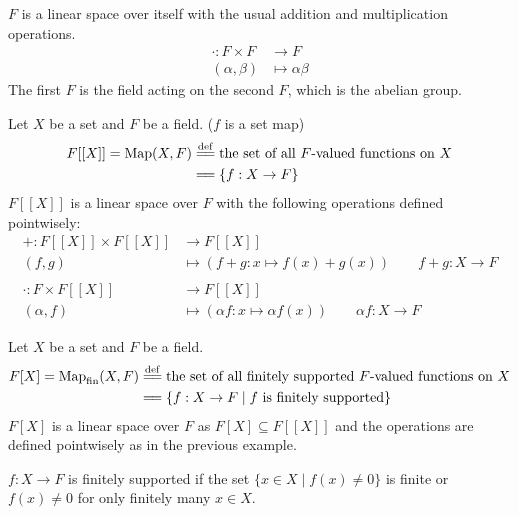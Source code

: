 \documentclass[
	11pt, %
	fleqn, %
	a4paper, %
]{LegrandOrangeBook}
\begin{document}
\begin{example}
    $F$ is a linear space over itself with the usual addition and multiplication operations.
    \[
        \begin{split}
            \cdot : F \times F &\to F \\
            (\alpha,\beta) &\mapsto \alpha \beta
        \end{split}
    \]
    The first $F$ is the field acting on the second $F$, which is the abelian group.
\end{example}

\begin{example}
    Let $X$ be a set and $F$ be a field. ($f$ is a set map)
    \[
    \begin{split}
        F[[X]] = \text{Map}(X, F) &\overset{\mathrm{def}}{=\joinrel=} \text{the set of all $F$-valued functions on } X \\
        &=\joinrel= \left\{ f : X \to F \right\}
    \end{split}
    \]
    $F[[X]]$ is a linear space over $F$ with the following operations defined pointwisely:
    \[
        \begin{split}
            + : F[[X]] \times F[[X]] &\to F[[X]] \\
            (f,g) &\mapsto (f+g: x \mapsto f(x) + g(x)) \qquad f + g : X \to F \\ \\
            \cdot : F \times F[[X]] &\to F[[X]] \\
            (\alpha,f) &\mapsto (\alpha f: x \mapsto \alpha f(x)) \qquad \alpha f : X \to F
        \end{split}
    \]
\end{example}

\begin{example}
    Let $X$ be a set and $F$ be a field.
    \[
        \begin{split}
            F[X] = \text{Map}_{\text{fin}}(X, F) &\overset{\mathrm{def}}{=\joinrel=} \text{the set of all finitely supported $F$-valued functions on } X \\
            &=\joinrel= \left\{ f : X \to F \mid f \text{ is finitely supported} \right\}
        \end{split}
    \]
    $F[X]$ is a linear space over $F$ as $F[X] \subseteq F[[X]]$ and the operations are defined pointwisely as in the previous example.

    $f: X \to F$ is finitely supported if the set $\{ x \in X \mid f(x) \neq 0 \}$ is finite or $f(x) \neq 0$ for only finitely many $x \in X$.
\end{example}
\end{document}
